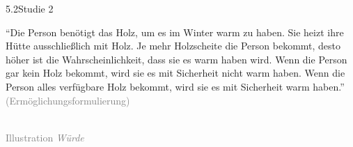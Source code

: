 \documentclass[xcolor=table,9pt,aspectratio=169]{beamer}
\begin{document}
\begin{frame}{\vspace*{10mm}5.2\hspace*{1em}Studie 2}
\begin{multicols}{2}
   \enquote{Die Person benötigt das Holz, um es im Winter warm zu haben. Sie heizt ihre Hütte ausschließlich mit Holz. Je mehr Holzscheite die Person bekommt, desto höher ist die Wahrscheinlichkeit, dass sie es warm haben wird. Wenn die Person gar kein Holz bekommt, wird sie es mit Sicherheit nicht warm haben. Wenn die Person alles verfügbare Holz bekommt, wird sie es mit Sicherheit warm haben.}\\
   \medskip
   \textcolor{gray}{(Ermöglichungsformulierung)}
   \vfill
   \begin{center}
      \\
      \textcolor{gray}{Illustration \textit{Würde}}
   \end{center}
\end{multicols}
\end{frame}
\end{document}
